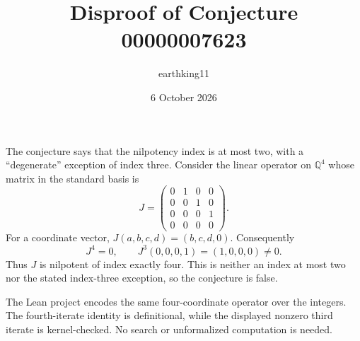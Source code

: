 \documentclass[11pt]{article}
\title{Disproof of Conjecture 00000007623}
\author{earthking11}
\date{6 October 2026}
\begin{document}
\maketitle

The conjecture says that the nilpotency index is at most two, with a
``degenerate'' exception of index three.  Consider the linear operator on
$\mathbb Q^4$ whose matrix in the standard basis is
\[
 J=\begin{pmatrix}
 0&1&0&0\\
 0&0&1&0\\
 0&0&0&1\\
 0&0&0&0
 \end{pmatrix}.
\]
For a coordinate vector, $J(a,b,c,d)=(b,c,d,0)$.  Consequently
\[
 J^4=0,
 \qquad
 J^3(0,0,0,1)=(1,0,0,0)\ne0.
\]
Thus $J$ is nilpotent of index exactly four.  This is neither an index at
most two nor the stated index-three exception, so the conjecture is false.

The Lean project encodes the same four-coordinate operator over the integers.
The fourth-iterate identity is definitional, while the displayed nonzero
third iterate is kernel-checked.  No search or unformalized computation is
needed.
\end{document}
